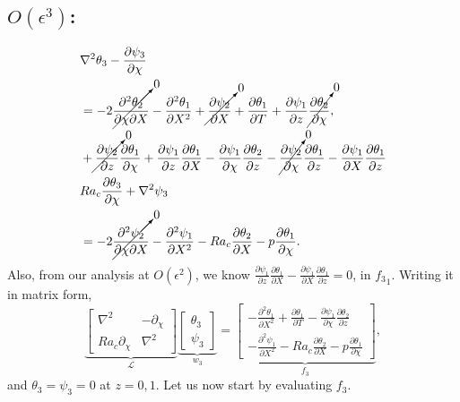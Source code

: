 \documentclass{article}
\newcommand{\pd}[2]{\frac{\partial{#1}}{\partial{#2}}}
\newcommand{\pdd}[2]{\frac{\partial^2{#1}}{\partial{#2}^2}}
\newcommand{\pddmixed}[3]{\frac{\partial^2{#1}}{\partial{#2}\partial{#3}}}
\newcommand{\lap}[1]{\nabla^{2}{#1}}
\begin{document}
\subsection{$O(\epsilon^{3})$:}
\begin{align}
 \begin{split}
  & \lap{\theta_{3}} - \pd{\psi_{3}}{\chi} \\
  & = -2 \cancelto{0}{\pddmixed{\theta_{2}}{\chi}{X}} - \pdd{\theta_{1}}{X} + \cancelto{0}{\pd{\psi_{2}}{X}} + \pd{\theta_{1}}{T} + \pd{\psi_{1}}{z} \cancelto{0}{\pd{\theta_{2}}{\chi}}, \\
  & + \cancelto{0}{\pd{\psi_{2}}{z}}\pd{\theta_{1}}{\chi} + \pd{\psi_{1}}{z}\pd{\theta_{1}}{X} - \pd{\psi_{1}}{\chi}\pd{\theta_{2}}{z} - \cancelto{0}{\pd{\psi_{2}}{\chi}}\pd{\theta_{1}}{z} - \pd{\psi_{1}}{X}\pd{\theta_{1}}{z}\\
  & Ra_{c} \pd{\theta_{3}}{\chi} + \lap{\psi_{3}} \\
  &=-2\cancelto{0}{\pddmixed{\psi_{2}}{\chi}{X}} - \pdd{\psi_{1}}{X} - Ra_{c}\pd{\theta_{2}}{X} - p \pd{\theta_{1}}{\chi}.
 \end{split}
\end{align}
Also, from our analysis at $O(\epsilon^{2})$, we know $\pd{\psi_{1}}{z}\pd{\theta_{1}}{X} - \pd{\psi_{1}}{X}\pd{\theta_{1}}{z} = 0$, in ${f_{3}}_{1}$.
Writing it in matrix form,
\begin{equation}\label{eq:order_3}
 \underbrace{\begin{bmatrix}
  \lap{} & -\partial_{\chi} \\
  Ra_{c}\partial_{\chi} & \lap{}
 \end{bmatrix}}_{\mathcal{L}}
 \underbrace{\begin{bmatrix}
  \theta_{3} \\
 \psi_{3}
 \end{bmatrix}}_{w_{3}}
 = \underbrace{\begin{bmatrix}
  - \pdd{\theta_{1}}{X} + \pd{\theta_{1}}{T} - \pd{\psi_{1}}{\chi}\pd{\theta_{2}}{z} \\
  - \pdd{\psi_{1}}{X} - Ra_{c}\pd{\theta_{2}}{X} - p \pd{\theta_{1}}{\chi}
 \end{bmatrix}}_{f_{3}},
\end{equation}
and $\theta_{3} = \psi_{3} = 0$ at $z=0, 1$. 
%
Let us now start by evaluating $f_{3}$.
\end{document}
